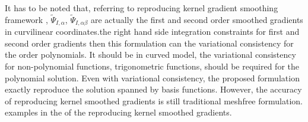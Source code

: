 It has to be noted that, referring to reproducing kernel gradient smoothing framework \cite{wang2019a}, $\tilde \Psi_{I,\alpha}$, $\tilde \Psi_{I,\alpha\beta}$ are actually the first and second order smoothed gradients in curvilinear coordinates.\DIFdelbegin {}\DIFdelend \DIFaddbegin {}\DIFaddend the right hand side integration constraints for first and second order gradients \DIFdelbegin \DIFdel{, }\DIFdelend \DIFaddbegin {}\DIFaddend then this formulation can \DIFdelbegin {}\DIFdelend \DIFaddbegin {}\DIFaddend the variational consistency for the \DIFdelbegin {}\DIFdelend \DIFaddbegin {}\DIFaddend order polynomials. It should be \DIFdelbegin {}\DIFdelend \DIFaddbegin {}\DIFaddend in curved model, the variational consistency for non-polynomial functions, \DIFdelbegin {}\DIFdelend \DIFaddbegin {}\DIFaddend trigonometric functions, should be required for the polynomial solution. Even with \DIFdelbegin {}\DIFdelend \DIFaddbegin {}\DIFaddend variational consistency, the proposed formulation \DIFdelbegin {}\DIFdelend \DIFaddbegin {}\DIFaddend exactly reproduce the solution spanned by \DIFaddbegin {}\DIFaddend basis functions. However, the accuracy of reproducing kernel smoothed gradients is still \DIFdelbegin {}\DIFdelend \DIFaddbegin {}\DIFaddend traditional meshfree formulation. \DIFdelbegin {}\DIFdelend \DIFaddbegin {}\DIFaddend examples in the \DIFdelbegin {}\DIFdelend \DIFaddbegin {}\DIFaddend of the reproducing kernel smoothed gradients.

